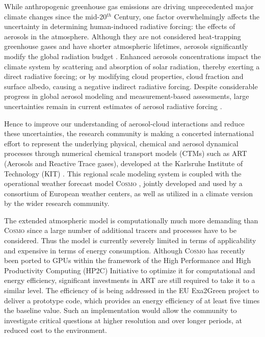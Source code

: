 While anthropogenic greenhouse gas emissions are driving unprecedented
major  climate changes  since  the mid-20$^{th}$  Century, one  factor
overwhelmingly  affects the  uncertainty in  determining human-induced
radiative  forcing:  the  effects   of  aerosols  in  the  atmosphere.
Although they  are not  considered heat-trapping greenhouse  gases and
have shorter atmospheric  lifetimes, aerosols significantly modify the
global   radiation   budget   \cite{IPCC-2013}.    Enhanced   aerosols
concentrations impact the climate  system by scattering and absorption
of solar radiation, thereby exerting a direct radiative forcing; or by
modifying cloud properties, cloud fraction and surface albedo, causing
a negative indirect  radiative forcing.  Despite considerable progress
in  global aerosol  modeling  \cite{Mann-2013} and  measurement-based
assessments,  large  uncertainties  remain  in  current  estimates  of
aerosol  radiative   forcing  \cite{IPCC-2013,  Lee-2013,  Myhre-2013,
Randles-2013, Rosenfeld-2013, Sherwood-2013, Stier-2013}.

Hence to  improve our understanding of  aerosol-cloud interactions and
reduce  these  uncertainties,  the  research  community  is  making  a
concerted international  effort to represent  the underlying physical,
chemical  and aerosol dynamical  processes through  numerical chemical
transport  models (CTMs)  such  as ART  (Aerosols  and Reactive  Trace
gases),   developed   at  the   Karlsruhe   Institute  of   Technology
(KIT)  \cite{Vogel-2009,  Bangert-2011,  Knote-2013}.   This  regional
scale  modeling  system  is  coupled  with  the  operational  weather
forecast  model \textsc{Cosmo} \cite{Baldauf-2011},  jointly developed
and  used by  a consortium  of European  weather centers,  as  well as
utilized in a climate version by the wider research community.

The extended  atmospheric model \cosmoart  is com\-put\-ationally much
more demanding than \textsc{Cosmo}  since a large number of additional
tracers  and processes  have  to  be considered.   Thus  the model  is
currently severely limited in  terms of applicability and expensive in
terms  of energy  consumption.  Although  \textsc{Cosmo}  has recently
been  ported  to  GPUs  \cite{Gysi-2014, Lapillonne-2014}  within  the
framework  of the  High  Performance and  High Productivity  Computing
(HP2C)  Initiative \cite{HP2C}  to optimize  it for  computational and
energy efficiency,  significant investments in ART  are still required
to take it  to a similar level.  The efficiency  of \cosmoart is being
addressed in  the EU Exa2Green  project \cite{EXA2GREEN} to  deliver a
prototype code, which  provides an energy efficiency of  at least five
times  the baseline  value.  Such  an implementation  would  allow the
community to  investigate critical questions at  higher resolution and
over longer periods, at reduced cost to the environment.

